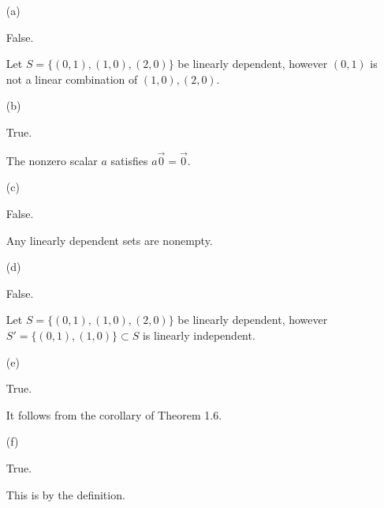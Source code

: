 \begin{Exercise}
\begin{enumerate}[(a)]
\item[(a)]
\begin{answer}
False.
\end{answer}
\begin{solution}
Let $S = \{(0,1),(1,0),(2,0)\}$ be linearly dependent, however $(0,1)$ is not a linear combination of $(1,0),(2,0)$.
\end{solution}

\item[(b)]
\begin{answer}
True.
\end{answer}
\begin{solution}
The nonzero scalar $a$ satisfies $a\vec{0} = \vec{0}$.
\end{solution}

\item[(c)]
\begin{answer}
False.
\end{answer}
\begin{solution}
Any linearly dependent sets are nonempty.
\end{solution}

\item[(d)]
\begin{answer}
False.
\end{answer}
\begin{solution}
Let $S = \{(0,1),(1,0),(2,0)\}$ be linearly dependent, however $S' = \{(0,1),(1,0)\}\subset S$ is linearly independent.
\end{solution}

\item[(e)]
\begin{answer}
True.
\end{answer}
\begin{solution}
It follows from the corollary of Theorem 1.6.
\end{solution}

\item[(f)]
\begin{answer}
True.
\end{answer}
\begin{solution}
This is by the definition.
\end{solution}

\end{enumerate}
\end{Exercise}